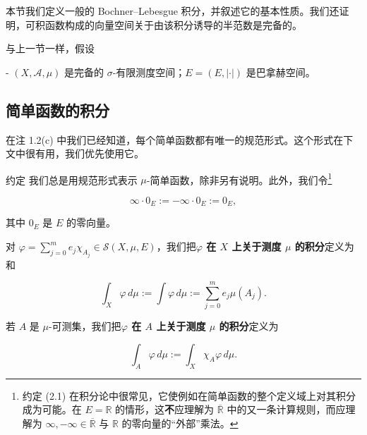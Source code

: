 本节我们定义一般的 Bochner–Lebesgue 积分，并叙述它的基本性质。我们还证明，可积函数构成的向量空间关于由该积分诱导的半范数是完备的。

与上一节一样，假设

- $ (X, \mathcal{A}, \mu) $ 是完备的 $ \sigma $-有限测度空间；$ E = (E, \left|\cdot\right|) $ 是巴拿赫空间。

\subsection*{简单函数的积分}

在注 1.2(c) 中我们已经知道，每个简单函数都有唯一的规范形式。这个形式在下文中很有用，我们优先使用它。

约定 我们总是用规范形式表示 $ \mu $-简单函数，除非另有说明。此外，我们令\footnote{约定 (2.1) 在积分论中很常见，它使例如在简单函数的整个定义域上对其积分成为可能。在 $ E = \mathbb{R} $ 的情形，这\textbf{不}应理解为 $ \overline{\mathbb{R}} $ 中的又一条计算规则，而应理解为 $ \infty, -\infty \in \overline{\mathbb{R}} $ 与 $ \mathbb{R} $ 的零向量的“外部”乘法。}

\begin{equation}
\infty \cdot 0_E := -\infty \cdot 0_E := 0_E ,\tag{2.1}
\end{equation}

其中 $ 0_E $ 是 $ E $ 的零向量。

对 $ \varphi = \sum_{j=0}^{m} e_j \chi_{A_j} \in \mathcal{S}(X,\mu,E) $，我们把\textbf{$ \varphi $ 在 $ X $ 上关于测度 $ \mu $ 的积分}定义为和

\[
\int_X \varphi \, d\mu := \int \varphi \, d\mu := \sum_{j=0}^{m} e_j \mu(A_j) .
\]

若 $ A $ 是 $ \mu $-可测集，我们把\textbf{$ \varphi $ 在 $ A $ 上关于测度 $ \mu $ 的积分}定义为

\[
\int_A \varphi \, d\mu := \int_X \chi_A \varphi \, d\mu .
\]

